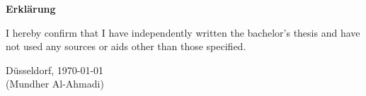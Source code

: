 \documentclass[12pt,english,titlepage,a4paper]{article}
\begin{document}
\pagebreak\noindent
\textbf{\LARGE Erkl\"arung}

\bigskip\bigskip
\noindent 
I hereby confirm that I have independently written the 
bachelor's thesis and have not used any sources or aids 
other than those specified.
\bigskip
\noindent

\bigskip\bigskip\bigskip
\noindent
D\"usseldorf, \today \\
(Mundher Al-Ahmadi)
\end{document}
